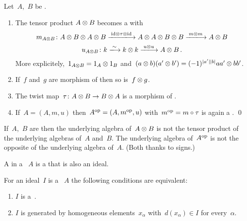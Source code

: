 \documentclass[a4paper,10pt,headings=standardclasses]{scrartcl}
\begin{document}
\begin{lemma}
  Let~$A$,~$B$ be {\dgas}.
  \begin{enumerate}
    \item
      The tensor product $A \otimes B$ becomes a {\dga} with
      \begin{gather*}
        m_{A \tensor B}
        \colon
        A \tensor B \tensor A \tensor B
        \xlongto{{\id} \tensor \tau \tensor {\id}}
        A \tensor A \tensor B \tensor B
        \xlongto{m \tensor m}
        A \tensor B
      \\
        u_{A \tensor B}
        \colon
        k
        \xlongto{\sim}
        k \tensor k
        \xlongto{u \tensor u}
        A \tensor B \,.
      \end{gather*}
      More explicitely,~$1_{A \otimes B} = 1_A \otimes 1_B$ and~$(a \otimes b) (a' \otimes b') = (-1)^{\lvert a'\rvert \lvert b\rvert} a a' \otimes b b'$.
    \item
      If~$f$ and~$g$ are morphism of {\dgas} then so is~$f \otimes g$.
    \item
      The twist map~$\tau \colon A \otimes B \to B \otimes A$ is a morphism of {\dgas}.
    \item
      If~$A = (A, m, u)$ then~$A^{\mathrm{op}} = (A, m^{\mathrm{op}}, u)$ with~$m^{\mathrm{op}} = m \circ \tau$ is again a {\dga}.
    \qed
  \end{enumerate}
\end{lemma}

\begin{warning}
  If~$A$,~$B$ are {\dgas} then the underlying algebra of~$A \otimes B$ is not the tensor product of the underlying algebras of~$A$ and~$B$.
  The underlying algebra of~$A^{\mathrm{op}}$ is not the opposite of the underlying algebra of~$A$.
  (Both thanks to signs.)
\end{warning}

\begin{definition}
  A  in a {\dga}~$A$ is a {\dgsub} that is also an ideal.
\end{definition}

\begin{lemma}
  For an ideal~$I$ is a {\dga}~$A$ the following conditions are equivalent:
  \begin{enumerate}
    \item
      $I$ is a~{\dgi}.
    \item
      $I$ is generated by homogeneous elements~$x_\alpha$ with~$d(x_\alpha) \in I$ for every~$\alpha$.
  \end{enumerate}
\end{lemma}
\end{document}

